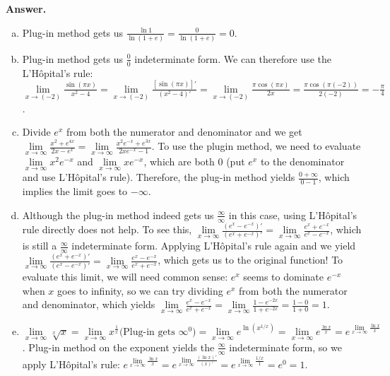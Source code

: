\documentclass[11pt,letterpaper]{article}
\newcommand{\answer}{\noindent \textbf{Answer. }}
\begin{document}
\answer
\begin{enumerate}[(a)]
    \item Plug-in method gets us $\frac{\ln 1}{\ln (1 + e)} = \frac{0}{\ln (1+e)} = 0$.
    \item Plug-in method gets us $\frac{0}{0}$ indeterminate form.  We can therefore use the L'Hôpital's rule: $\lim\limits_{x \to (-2)} \frac{\sin(\pi x)}{x^2-4} = \lim\limits_{x \to (-2)} \frac{[\sin(\pi x)]'}{(x^2-4)'} = \lim\limits_{x \to (-2)} \frac{\pi\cos(\pi x)}{2x} = \frac{\pi\cos(\pi(-2))}{2(-2)} = -\frac{\pi}{4}$.
    \item Divide $e^x$ from both the numerator and denominator and we get $\lim\limits_{x \to \infty} \frac{x^2 + e^{4x}}{2x-e^x} = \lim\limits_{x \to \infty} \frac{x^2e^{-x} + e^{3x}}{2xe^{-x}-1}$.  To use the plugin method, we need to evaluate $\lim\limits_{x \to \infty} x^2e^{-x}$ and $\lim\limits_{x \to \infty} xe^{-x}$, which are both $0$ (put $e^{x}$ to the denominator and use L'Hôpital's rule).  Therefore, the plug-in method yields $\frac{0+\infty}{0-1}$, which implies the limit goes to $-\infty$.
    \item Although the plug-in method indeed gets us $\frac{\infty}{\infty}$ in this case, using L'Hôpital's rule directly does not help.  To see this, $\lim\limits_{x \to \infty} \frac{(e^x-e^{-x})'}{(e^x+e^{-x})'} = \lim\limits_{x \to \infty} \frac{e^x+e^{-x}}{e^x-e^{-x}}$, which is still a $\frac{\infty}{\infty}$ indeterminate form.  Applying L'Hôpital's rule again and we yield $\lim\limits_{x \to \infty} \frac{(e^x+e^{-x})'}{(e^x-e^{-x})'} = \lim\limits_{x \to \infty} \frac{e^x-e^{-x}}{e^x+e^{-x}}$, which gets us to the original function!  To evaluate this limit, we will need common sense: $e^x$ seems to dominate $e^{-x}$ when $x$ goes to infinity, so we can try dividing $e^x$ from both the numerator and denominator, which yields $\lim\limits_{x \to \infty} \frac{e^x-e^{-x}}{e^x+e^{-x}} = \lim\limits_{x \to \infty} \frac{1-e^{-2x}}{1+e^{-2x}} = \frac{1-0}{1+0} = 1$.
    \item $\lim\limits_{x \to \infty} \sqrt[x]{x} = \lim\limits_{x \to \infty} x^{\frac{1}{x}} \text{(Plug-in gets } \infty^0 \text{)} = \lim\limits_{x \to \infty} e^{\ln (x^{1/x})} = \lim\limits_{x \to \infty} e^{\frac{\ln x}{x}} = e^{\lim\limits_{x \to \infty} \frac{\ln x}{x}}$.  Plug-in method on the exponent yields the $\frac{\infty}{\infty}$ indeterminate form, so we apply L'Hôpital's rule: $e^{\lim\limits_{x \to \infty} \frac{\ln x}{x}} = e^{\lim\limits_{x \to \infty} \frac{(\ln x)'}{(x)'}} = e^{\lim\limits_{x \to \infty} \frac{1/x}{1}} = e^0 = 1$. 
\end{enumerate}\vspace{6mm}
\end{document}
